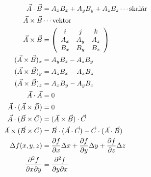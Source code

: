     \begin{align}
      \vec{A}\cdot \vec{B}    
        &=      A_x B_x+A_y B_y+A_z B_z \cdots\text{skalár}                           \\
      \vec{A}\times\vec{B}    
        &\cdots \mathrm{vektor}                                                       \\
      \vec{A}\times\vec{B}    
        &=  \left(
              \begin{array}{ccc}
                 i  &  j  &  k   \\
                A_x & A_y & A_z  \\
                B_x & B_y & B_z
              \end{array}
            \right)                                                                   \\
     (\vec{A}\times \vec{B})_x 
       &= A_yB_z-A_zB_y \label{temp:eq_slozky_vek_soucinu}                            \\
     (\vec{A}\times \vec{B})_y 
       &= A_zB_x-A_xB_z                                                     \nonumber \\
     (\vec{A}\times \vec{B})_z 
       &= A_xB_y-A_yB_x                                                     \nonumber \\
      \vec{A}\cdot  \vec{A}     
       &= 0                                                                           \\
      \vec{A}\cdot (\vec{A}\times\vec{B})   
       &= 0                                                                           \\
      \vec{A}\cdot (\vec{B}\times\vec{C})  
       &= (\vec{A}\times \vec{B})\cdot\vec{C}                                         \\
      \vec{A}\times(\vec{B}\times\vec{C})  
        &=  \vec{B}\cdot (\vec{A} \cdot\vec{C})
           -\vec{C}\cdot (\vec{A} \cdot\vec{B})
                                                    \label{fey:eq_baccab}             \\
      \Delta f(x,y,z)                      
        &=  \frac{\partial f}{\partial x}\Delta x +
            \frac{\partial f}{\partial y}\Delta y + 
            \frac{\partial f}{\partial z}\Delta z                     \label{temp:eq_total_difr}        \\
      \frac{\partial^2f}{\partial x\partial y}
        &=\frac{\partial^2f}{\partial y\partial x}  \label{temp:eq_sec_parc_eqvival}
    \end{align} 

